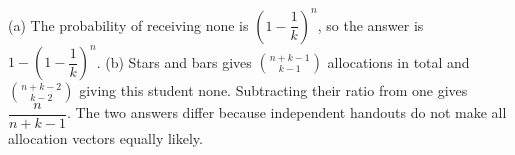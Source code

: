 (a) The probability of receiving none is $(1-\dfrac{1}{k})^n$, so the answer is $\boxed{1-(1-\dfrac{1}{k})^n}$. (b) Stars and bars gives $\binom{n+k-1}{k-1}$ allocations in total and $\binom{n+k-2}{k-2}$ giving this student none. Subtracting their ratio from one gives $\boxed{\dfrac{n}{n+k-1}}$. The two answers differ because independent handouts do not make all allocation vectors equally likely.
